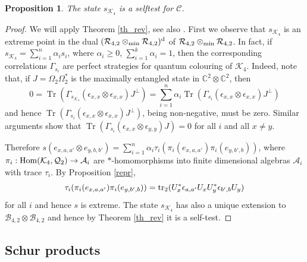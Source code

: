 \documentclass[11pt]{amsart}
\newtheorem{proposition}[theorem]{Proposition}
\theoremstyle{definition}
\DeclareMathOperator{\tr}{Tr}
\newcommand{\cl}[1]{\mathcal{#1}}
\DeclareMathOperator{\Tr}{Tr}
\begin{document}
\begin{proposition}\label{p:s_k}
The state $s_{\cl K_4}$ is a selftest for $\cl C$.
\end{proposition}

\begin{proof}
   We will apply Theorem \ref{th_rev}, see also \cite[Theorem 4.12]{pszz}. First we observe that $s_{\cl K_4}$ is an extreme point in 
   the dual $(\cl R_{4,2}\otimes_{\rm min}\cl R_{4,2})^{\rm d}$
   of $\cl R_{4,2}\otimes_{\rm min}\cl R_{4,2}$. In fact, if $s_{\cl K_4} = \sum_{i=1}^n\alpha_is_i$, where $\alpha_i\geq 0$, $\sum_{i=1}^k\alpha_i=1$, then the corresponding correlations $\Gamma_{s_i}$ are perfect strategies for quantum colouring of $\cl K_4$. 
Indeed, note that, if $J = \Omega_2\Omega_2^*$ is the maximally entangled state  in $\mathbb C^2\otimes\mathbb C^2$, then
$$0=\Tr(\Gamma_{s_{\cl K_4}}(\epsilon_{x,x}\otimes\epsilon_{x,x})J^\perp)=\sum_{i=1}^n\alpha_i\Tr(\Gamma_{s_i}(\epsilon_{x,x}\otimes\epsilon_{x,x})J^\perp)$$
   and hence $\Tr(\Gamma_{s_i}(\epsilon_{x,x}\otimes\epsilon_{x,x})J^\perp)$,
   being non-negative, must be zero. Similar arguments show that 
   $\tr(\Gamma_{s_i}(\epsilon_{x,x}\otimes\epsilon_{y,y})J)=0$ for all $i$ and all $x\ne y$.

   Therefore $s(e_{x,a,a'}\otimes e_{y,b,b'})=\sum_{i=1}^n\alpha_i\tau_i(\pi_i(e_{x,a,a'})\pi_i(e_{y,b',b}))$, where $\pi_i: {\rm Hom}(\cl K_{4}, \cl Q_2)\to \cl A_i$ are 
   $*$-homomorphisms into finite dimensional algebras $\cl A_i$ with trace $\tau_i$. 
   By Proposition \ref{repr},
$$\tau_i(\pi_i(e_{x,a,a'})\pi_i(e_{y,b',b})) = {\rm tr}_2(U_x^*\epsilon_{a,a'}U_xU_y^*\epsilon_{b',b}U_y)$$ for all $i$ and hence $s$ is extreme. 
The state $s_{\cl K_4}$ has also a unique extension to $\cl B_{4,2}\otimes\cl B_{4,2}$ and hence by Theorem \ref{th_rev} it is a self-test. 
\end{proof}




\subsection{Schur products}\label{s:schur}
\end{document}
